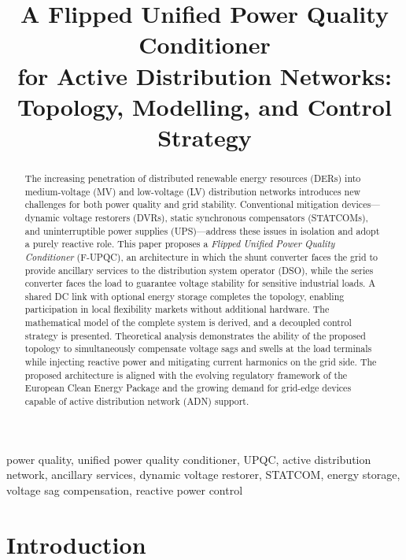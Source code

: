 \documentclass[conference]{IEEEtran}
\title{%
  A Flipped Unified Power Quality Conditioner\\
  for Active Distribution Networks:\\
  Topology, Modelling, and Control Strategy%
}
\author{%
  \IEEEauthorblockN{Davide Bagnara}
  \IEEEauthorblockA{%
    Independent Researcher\\
    Sterzing (BZ), Italy\\
    \href{mailto:davide.bagnara@example.com}{davide.bagnara@example.com}%
  }
}
\begin{document}
\maketitle


\begin{abstract}
The increasing penetration of distributed renewable energy resources
(DERs) into medium-voltage (MV) and low-voltage (LV) distribution
networks introduces new challenges for both power quality and grid
stability. Conventional mitigation devices---dynamic voltage restorers
(DVRs), static synchronous compensators (STATCOMs), and
uninterruptible power supplies (UPS)---address these issues in
isolation and adopt a purely reactive role.
This paper proposes a \emph{Flipped Unified Power Quality Conditioner}
(F-UPQC), an architecture in which the shunt converter faces the grid
to provide ancillary services to the distribution system operator
(DSO), while the series converter faces the load to guarantee voltage
stability for sensitive industrial loads.
A shared DC link with optional energy storage completes the topology,
enabling participation in local flexibility markets without additional
hardware.
The mathematical model of the complete system is derived, and a
decoupled control strategy is presented. Theoretical analysis
demonstrates the ability of the proposed topology to simultaneously
compensate voltage sags and swells at the load terminals while
injecting reactive power and mitigating current harmonics on the grid
side. The proposed architecture is aligned with the evolving regulatory
framework of the European Clean Energy Package and the growing demand
for grid-edge devices capable of active distribution network (ADN)
support.
\end{abstract}

\begin{IEEEkeywords}
power quality, unified power quality conditioner, UPQC, active
distribution network, ancillary services, dynamic voltage restorer,
STATCOM, energy storage, voltage sag compensation, reactive power
control
\end{IEEEkeywords}


\section{Introduction}
\label{sec:introduction}
\end{document}

